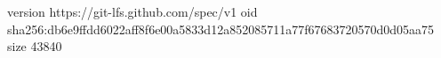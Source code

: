 version https://git-lfs.github.com/spec/v1
oid sha256:db6e9ffdd6022aff8f6e00a5833d12a852085711a77f67683720570d0d05aa75
size 43840
